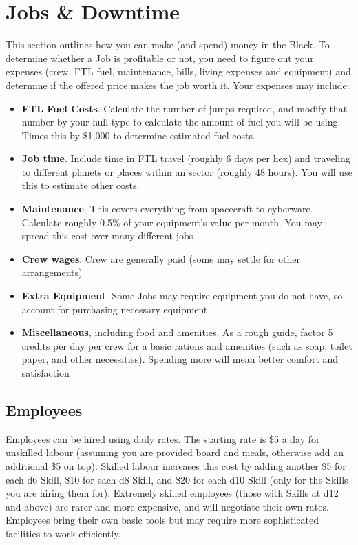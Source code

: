 
\section{Jobs \& Downtime}

\begin{multicols}{2}

  This section outlines how you can make (and spend) money in the Black. To determine whether a Job is profitable or not, you need to figure out your expenses (crew, FTL fuel, maintenance, bills, living expenses and equipment) and determine if the offered price makes the job worth it. Your expenses may include:
  
  \begin{itemize}
    \item \textbf{FTL Fuel Costs}. Calculate the number of jumps required, and modify that number by your hull type to calculate the amount of fuel you will be using. Times this by \$1,000 to determine estimated fuel costs.
    \item \textbf{Job time}. Include time in FTL travel (roughly 6 days per hex) and traveling to different planets or places within an sector (roughly 48 hours). You will use this to estimate other costs.
    \item \textbf{Maintenance}. This covers everything from spacecraft to cyberware. Calculate roughly 0.5\% of your equipment's value per month. You may spread this cost over many different jobs
    \item \textbf{Crew wages}. Crew are generally paid (some may settle for other arrangements)
    \item \textbf{Extra Equipment}. Some Jobs may require equipment you do not have, so account for purchasing necessary equipment
    \item \textbf{Miscellaneous}, including food and amenities. As a rough guide, factor 5 credits per day per crew for a basic rations and amenities (such as soap, toilet paper, and other necessities). Spending more will mean better comfort and satisfaction
  \end{itemize}
  
\subsection{Employees}

  Employees can be hired using daily rates. The starting rate is \$5 a day for unskilled labour (assuming you are provided board and meals, otherwise add an additional \$5 on top). Skilled labour increases this cost by adding another \$5 for each d6 Skill, \$10 for each d8 Skill, and \$20 for each d10 Skill (only for the Skills you are hiring them for). Extremely skilled employees (those with Skills at d12 and above) are rarer and more expensive, and will negotiate their own rates. Employees bring their own basic tools but may require more sophisticated facilities to work efficiently.
  

\end{multicols}

